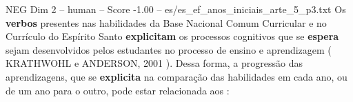 \begin{textsample}{NEG Dim 2 – human – Score -1.00 – es/es\_ef\_anos\_iniciais\_arte\_5\_p3.txt}  \label{ex:f2_neg_004}
Os \textbf{verbos} presentes nas habilidades da Base Nacional Comum Curricular e no Currículo do Espírito Santo \textbf{explicitam} os processos cognitivos que se \textbf{espera} sejam desenvolvidos pelos estudantes no processo de ensino e aprendizagem ( KRATHWOHL e ANDERSON, 2001 ).
Dessa forma, a progressão das aprendizagens, que se \textbf{explicita} na comparação das habilidades em cada ano, ou de um ano para o outro, pode estar relacionada aos :

\end{textsample}
